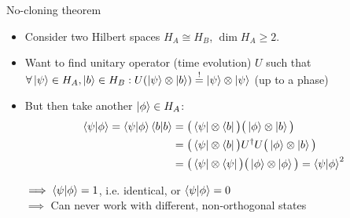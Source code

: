 \documentclass{beamer}
\begin{document}
	\begin{frame}{No-cloning theorem}
		\begin{itemize}
			\item Consider two Hilbert spaces $H_A \cong H_B$,
			$\operatorname{dim}H_A \geq 2$.

			\item Want to find unitary operator (time evolution) $U$
			such that $\forall \ket{\psi} \in H_A, \ket{b} \in H_B: U(\ket{\psi} \otimes \ket{b}) \overset{!}{=} \ket{\psi} \otimes \ket{\psi}$ (up to a phase)
			
			\item But then take another $\ket{\phi} \in H_A$:
				\begin{align*}
					\braket{\psi|\phi} = \braket{\psi|\phi}\braket{b|b} &= \big(\bra{\psi} \otimes \bra{b}\big) \big(\ket{\phi} \otimes \ket{b}\big) \\
					&= \big(\bra{\psi} \otimes \bra{b}\big) U^\dagger U \big(\ket{\phi} \otimes \ket{b}\big) \\
					&= \big(\bra{\psi} \otimes \bra{\psi}\big) \big(\ket{\phi} \otimes \ket{\phi}\big)
					= \braket{\psi|\phi}^2
				\end{align*}

				$\implies \braket{\psi|\phi} = 1$, i.e. identical, or $\braket{\psi|\phi} = 0$ \\
				$\implies$ Can never work with different, non-orthogonal states


		\end{itemize}
	\end{frame}
\end{document}
